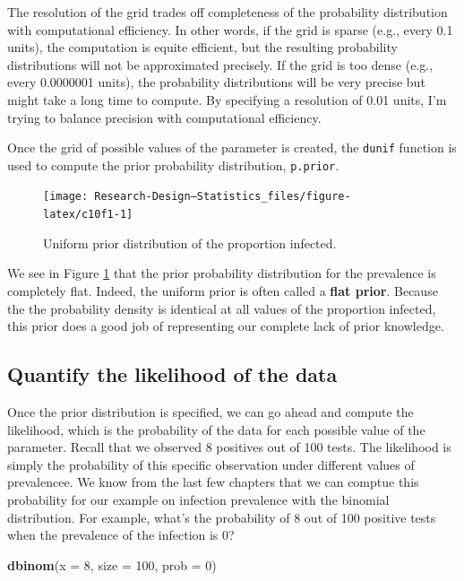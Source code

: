 \documentclass[
]{book}
\newenvironment{Shaded}{\begin{snugshade}}{\end{snugshade}}
\newcommand{\AttributeTok}[1]{\textcolor[rgb]{0.13,0.29,0.53}{#1}}
\newcommand{\DecValTok}[1]{\textcolor[rgb]{0.00,0.00,0.81}{#1}}
\newcommand{\FunctionTok}[1]{\textcolor[rgb]{0.13,0.29,0.53}{\textbf{#1}}}
\newcommand{\NormalTok}[1]{#1}
\begin{document}
The resolution of the grid trades off completeness of the probability distribution with computational efficiency. In other words, if the grid is sparse (e.g., every 0.1 units), the computation is equite efficient, but the resulting probability distributions will not be approximated precisely. If the grid is too dense (e.g., every 0.0000001 units), the probability distributions will be very precise but might take a long time to compute. By specifying a resolution of 0.01 units, I'm trying to balance precision with computational efficiency.

Once the grid of possible values of the parameter is created, the \texttt{dunif} function is used to compute the prior probability distribution, \texttt{p.prior}.

\begin{figure}

{\centering \texttt{[image: Research-Design---Statistics\_files/figure-latex/c10f1-1]} 

}

\caption{Uniform prior distribution of the proportion infected.}\label{fig:c10f1}
\end{figure}

We see in Figure \ref{fig:c10f1} that the prior probability distribution for the prevalence is completely flat. Indeed, the uniform prior is often called a \textbf{flat prior}. Because the the probability density is identical at all values of the proportion infected, this prior does a good job of representing our complete lack of prior knowledge.

\subsection{Quantify the likelihood of the data}\label{quantify-the-likelihood-of-the-data}

Once the prior distribution is specified, we can go ahead and compute the likelihood, which is the probability of the data for each possible value of the parameter. Recall that we observed 8 positives out of 100 tests. The likelihood is simply the probability of this specific observation under different values of prevalencee. We know from the last few chapters that we can comptue this probability for our example on infection prevalence with the binomial distribution. For example, what's the probability of 8 out of 100 positive tests when the prevalence of the infection is 0?

\begin{Shaded}
\begin{Highlighting}[]
\FunctionTok{dbinom}\NormalTok{(}\AttributeTok{x =} \DecValTok{8}\NormalTok{, }\AttributeTok{size =} \DecValTok{100}\NormalTok{, }\AttributeTok{prob =} \DecValTok{0}\NormalTok{)}
\end{Highlighting}
\end{Shaded}
\end{document}
